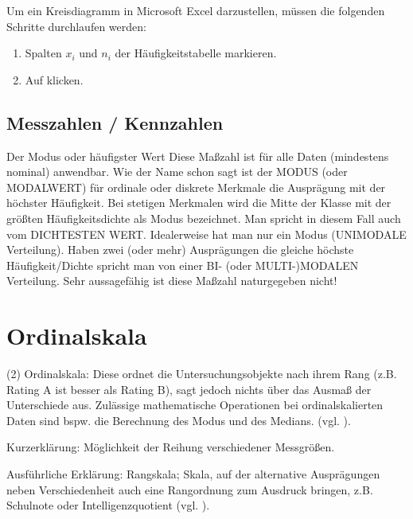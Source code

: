 Um ein Kreisdiagramm in Microsoft Excel darzustellen, müssen die folgenden Schritte durchlaufen
werden:

\begin{enumerate}
  \item Spalten $x_i$ und $n_i$ der Häufigkeitstabelle markieren.
  \item Auf  klicken.
\end{enumerate}



\subsection{Messzahlen / Kennzahlen}

Der Modus oder häufigster Wert
Diese Maßzahl ist für alle Daten (mindestens nominal) anwendbar.
Wie der Name schon sagt ist der MODUS (oder MODALWERT) für ordinale oder
diskrete Merkmale die Ausprägung mit der höchster Häufigkeit.
Bei stetigen Merkmalen wird die Mitte der Klasse mit der größten
Häufigkeitsdichte als Modus bezeichnet. Man spricht in diesem Fall auch vom
DICHTESTEN WERT.
Idealerweise hat man nur ein Modus (UNIMODALE Verteilung). Haben zwei
(oder mehr) Ausprägungen die gleiche höchste Häufigkeit/Dichte spricht man
von einer BI- (oder MULTI-)MODALEN Verteilung.
Sehr aussagefähig ist diese Maßzahl naturgegeben nicht!


\section{Ordinalskala}
\todo[Umformulieren]
(2) Ordinalskala: Diese ordnet die Untersuchungsobjekte nach ihrem Rang (z.B. Rating A ist besser als Rating B), sagt jedoch nichts über das Ausmaß der Unterschiede aus. Zulässige mathematische Operationen bei ordinalskalierten Daten sind bspw. die Berechnung des Modus und des Medians.
(vgl. ).

Kurzerklärung:
Möglichkeit der Reihung verschiedener Messgrößen.

Ausführliche Erklärung:
Rangskala; Skala, auf der alternative Ausprägungen neben Verschiedenheit auch eine Rangordnung zum
Ausdruck bringen, z.B. Schulnote oder Intelligenzquotient (vgl.
).

